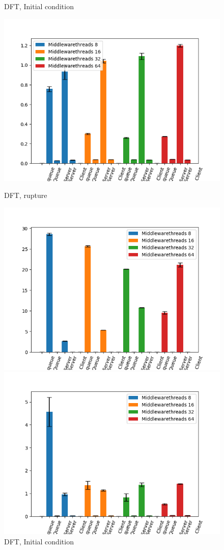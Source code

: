 \documentclass[11pt,a4paper]{article}
\begin{document}
\begin{figure}[!ht]
\begin{minipage}[b]{0.5\linewidth}
    \caption{DFT, Initial condition} 
    \vspace{4ex}
  \end{minipage}%
  \begin{minipage}[b]{0.5\linewidth}
    \centering
    \includegraphics[width=0.7\linewidth]{img/exp3_1/exp3_1_mw_percentile_plots_writes_1__vc_4.png} 
    \caption{DFT, rupture} 
    \vspace{4ex}
  \end{minipage} 
    \begin{minipage}[b]{0.5\linewidth}
    \centering
    \includegraphics[width=0.7\linewidth]{img/exp3_1/exp3_1_mw_percentile_plots_writes_0__vc_16.png} 
    \caption{DFT, Initial condition} 
    \vspace{4ex}
  \end{minipage}%
  \begin{minipage}[b]{0.5\linewidth}
    \centering
    \includegraphics[width=0.7\linewidth]{img/exp3_1/exp3_1_mw_percentile_plots_writes_1__vc_16.png} 

\end{minipage}
\end{figure}
\end{document}

